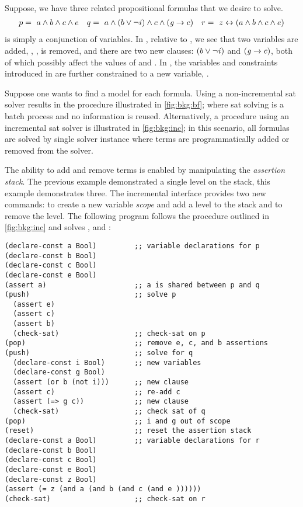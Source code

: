 ~\label{section:background-incremental}
%
%

%
%
Suppose, we have three related propositional formulas that we desire to solve.
%
\begin{align*}
  p =\ a \wedge b \wedge c \wedge e && q=\ a \wedge (b \vee \neg \mathit{i}{}) \wedge c \wedge (\mathit{g}{} \rightarrow c) && r =~z \leftrightarrow (a \wedge b \wedge c \wedge e)
\end{align*}
%
\pV{} is simply a conjunction of variables. In \qV{}, relative to \pV{}, we see
that two variables are added, \iV{}, \gV{}, \eV{} is removed, and there are two
new clauses: $(b \vee \neg \mathit{i}{})$ and $(\mathit{g}{} \rightarrow c)$, both of which
possibly affect the values of \bV{} and \cV{}. In \rV{}, the variables and
constraints introduced in \pV{} are further constrained to a new variable,
\zV{}.

Suppose one wants to find a model for each formula. Using a non-incremental
\ac{sat} solver results in the procedure illustrated in \autoref{fig:bkg:bf};
where \ac{sat} solving is a batch process and no information is reused.
Alternatively, a procedure using an incremental \ac{sat} solver is illustrated
in \autoref{fig:bkg:inc}; in this scenario, all formulas are solved by single
solver instance where terms are programmatically added or removed from the
solver.

The ability to add and remove terms is enabled by manipulating the
\textit{assertion stack}. The previous example demonstrated a single level on
the stack, this example demonstrates three. The incremental interface provides
two new commands:  to create a new variable \emph{scope} and add a
level to the stack and  to remove the level. The following program
follows the procedure outlined in \autoref{fig:bkg:inc} and solves \pV, \qV{}
and \rV{}:

\begin{lstlisting}[columns=flexible,keepspaces=true,language=SMTLIB]
(declare-const a Bool)         ;; variable declarations for p
(declare-const b Bool)
(declare-const c Bool)
(declare-const e Bool)
(assert a)                     ;; a is shared between p and q
(push)                         ;; solve p
  (assert e)
  (assert c)
  (assert b)
  (check-sat)                  ;; check-sat on p
(pop)                          ;; remove e, c, and b assertions
(push)                         ;; solve for q
  (declare-const i Bool)       ;; new variables
  (declare-const g Bool)
  (assert (or b (not i)))      ;; new clause
  (assert c)                   ;; re-add c
  (assert (=> g c))            ;; new clause
  (check-sat)                  ;; check sat of q
(pop)                          ;; i and g out of scope
(reset)                        ;; reset the assertion stack
(declare-const a Bool)         ;; variable declarations for r
(declare-const b Bool)
(declare-const c Bool)
(declare-const e Bool)
(declare-const z Bool)
(assert (= z (and a (and b (and c (and e ))))))
(check-sat)                    ;; check-sat on r
\end{lstlisting}

